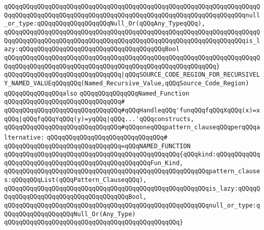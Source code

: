 \verb|qQQqqQQqqQQqqQQqqQQqqQQqqQQqqQQqqQQqqQQqqQQqqQQqqQQqqQQqqQQqqQQqqQQqqQQqqQQqqQQqqQQqqQQqqQQqqQQqqQQqqQQqqQQqqQQqqQQqqQQqqQQqqQQqqQQqqQQqnull_or_type:qQQqqQQqqQQqqQQqqQQqNull_Or(qQQqAny_TypeqQQq),|\newline
\verb|qQQqqQQqqQQqqQQqqQQqqQQqqQQqqQQqqQQqqQQqqQQqqQQqqQQqqQQqqQQqqQQqqQQqqQQqqQQqqQQqqQQqqQQqqQQqqQQqqQQqqQQqqQQqqQQqqQQqqQQqqQQqqQQqqQQqqQQqis_lazy:qQQqqQQqqQQqqQQqqQQqqQQqqQQqqQQqqQQqqQQqBool|\newline
\verb|qQQqqQQqqQQqqQQqqQQqqQQqqQQqqQQqqQQqqQQqqQQqqQQqqQQqqQQqqQQqqQQqqQQqqQQqqQQqqQQqqQQqqQQqqQQqqQQqqQQqqQQqqQQqqQQqqQQqqQQqqQQqqQQq}|\newline
\newline
\verb|qQQqqQQqqQQqqQQqqQQqqQQqqQQqqQQq|\verb#|qQQqSOURCE_CODE_REGION_FOR_RECURSIVELY_NAMED_VALUEqQQqqQQq(Named_Recursive_Value,qQQqSource_Code_Region)#\newline
\newline
\newline
\newline
\verb|qQQqqQQqqQQqqQQqalso|\newline
\verb|qQQqqQQqqQQqqQQqNamed_Function|\newline
\verb|qQQqqQQqqQQqqQQqqQQqqQQqqQQqqQQq#|\newline
\verb|qQQqqQQqqQQqqQQqqQQqqQQqqQQqqQQq#qQQqHandleqQQq'funqQQqfqQQqXqQQq(x)=xqQQq|\verb#|qQQqfqQQqYqQQq(y)=yqQQq|qQQq...'qQQqconstructs,#\newline
\verb|qQQqqQQqqQQqqQQqqQQqqQQqqQQqqQQq#qQQqoneqQQqpattern_clauseqQQqperqQQqalternative:|\newline
\verb|qQQqqQQqqQQqqQQqqQQqqQQqqQQqqQQq#|\newline
\verb|qQQqqQQqqQQqqQQqqQQqqQQqqQQqqQQq=qQQqNAMED_FUNCTION|\newline
\verb|qQQqqQQqqQQqqQQqqQQqqQQqqQQqqQQqqQQqqQQqqQQqqQQq{qQQqkind:qQQqqQQqqQQqqQQqqQQqqQQqqQQqqQQqqQQqqQQqqQQqqQQqqQQqFun_Kind,|\newline
\verb|qQQqqQQqqQQqqQQqqQQqqQQqqQQqqQQqqQQqqQQqqQQqqQQqqQQqqQQqpattern_clauses:qQQqqQQqList(qQQqPattern_ClauseqQQq),|\newline
\verb|qQQqqQQqqQQqqQQqqQQqqQQqqQQqqQQqqQQqqQQqqQQqqQQqqQQqqQQqis_lazy:qQQqqQQqqQQqqQQqqQQqqQQqqQQqqQQqqQQqqQQqBool,|\newline
\verb|qQQqqQQqqQQqqQQqqQQqqQQqqQQqqQQqqQQqqQQqqQQqqQQqqQQqqQQqnull_or_type:qQQqqQQqqQQqqQQqqQQqNull_Or(Any_Type)|\newline
\verb|qQQqqQQqqQQqqQQqqQQqqQQqqQQqqQQqqQQqqQQqqQQqqQQq}|\newline
